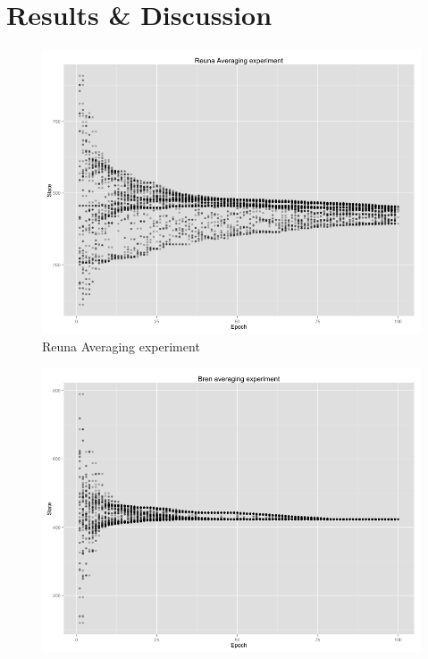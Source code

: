 \section{Results \& Discussion}
\label{sec:result}
\begin{figure}[h!]
	\centering
    \begin{minipage}[t]{0.47\textwidth}
    \vspace{0pt}
    \includegraphics[width=\linewidth]{figures/Reuna.png}
    Reuna Averaging experiment
    \end{minipage}
    \begin{minipage}[t]{0.47\textwidth}
    \vspace{0pt}
    \includegraphics[width=\linewidth]{figures/Bren.png}

\end{minipage}
\end{figure}
